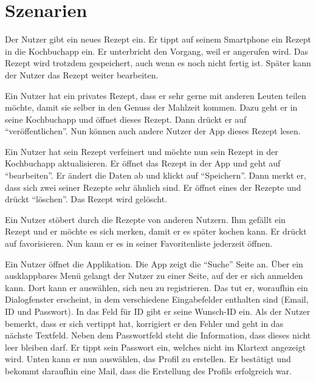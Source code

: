 
\section{Szenarien}



 Der Nutzer gibt ein neues Rezept ein. Er tippt auf seinem Smartphone ein Rezept in die \gls{Kochbuchapp} ein. Er unterbricht den Vorgang, weil er angerufen wird. Das Rezept wird trotzdem gespeichert, auch wenn es noch nicht fertig ist. Später kann der Nutzer das Rezept weiter bearbeiten.

Ein Nutzer hat ein privates Rezept, dass er sehr gerne mit anderen Leuten teilen möchte, damit sie selber in den Genuss der Mahlzeit kommen. Dazu geht er in seine \gls{Kochbuchapp} und öffnet dieses Rezept. Dann drückt er auf "`veröffentlichen"'. Nun können auch andere Nutzer der App dieses Rezept lesen.

Ein Nutzer hat sein Rezept verfeinert und möchte nun sein Rezept in der Kochbuchapp aktualisieren. Er öffnet das Rezept in der App und geht auf "`bearbeiten"'. Er ändert die Daten ab und klickt auf "`Speichern"'. Dann merkt er, dass sich zwei seiner Rezepte sehr ähnlich sind. Er öffnet eines der Rezepte und drückt "`löschen"'. Das Rezept wird gelöscht.

Ein Nutzer stöbert durch die Rezepte von anderen Nutzern. Ihm gefällt ein Rezept und er möchte es sich merken, damit er es später kochen kann. Er drückt auf favorisieren. Nun kann er es in seiner Favoritenliste jederzeit öffnen.

Ein Nutzer öffnet die Applikation. Die App zeigt die "`Suche"' Seite an. Über ein ausklappbares Menü gelangt der Nutzer zu einer Seite, auf der er sich anmelden kann. Dort kann er auswählen, sich neu zu registrieren. Das tut er, woraufhin ein \gls{Dialogfenster} erscheint, in dem verschiedene Eingabefelder enthalten sind (Email, ID und Passwort). In das Feld für \gls{ID} gibt er seine Wunsch-\gls{ID} ein. Als der Nutzer bemerkt, dass er sich vertippt hat, korrigiert er den Fehler und geht in das nächste Textfeld. Neben dem Passwortfeld steht die Information, dass dieses nicht leer bleiben darf. Er tippt sein Passwort ein, welches nicht im Klartext angezeigt wird. Unten kann er nun auswählen, das Profil zu erstellen. Er bestätigt und bekommt daraufhin eine Mail, dass die Erstellung des Profils erfolgreich war.

